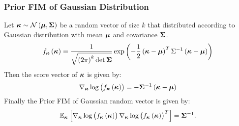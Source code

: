 





\subsubsection{Prior FIM of Gaussian Distribution}\label{apx:prior_fim_gaussian}
Let $\bm{\kappa}\sim\mathcal{N}\left(\bm{\mu},\mathbf{\Sigma}\right)$ be a random vector of size $k$ that distributed according to Gaussian distribution with mean $\bm{\mu}$ and covariance $\mathbf{\Sigma}$.
\begin{equation}
    f_{\bm{\kappa}}\left(\bm{\kappa}\right)=\frac{1}{\sqrt{\left(2\pi\right)^k\det{\mathbf{\Sigma}}}}\exp\left(-\frac{1}{2}\left(\bm{\kappa}-\bm{\mu}\right)^T\Sigma^{-1}\left(\bm{\kappa}-\bm{\mu}\right)\right)
\end{equation}
Then the score vector of $\bm{\kappa}$ is given by:
\begin{equation}
    \nabla_{\bm{\kappa}}\log\left(f_{\bm{\kappa}}\left(\bm{\kappa}\right)\right)=-\mathbf{\Sigma}^{-1}\left(\bm{\kappa}-\bm{\mu}\right)
\end{equation}
Finally the Prior FIM of Gaussian random vector is given by:
\begin{equation}
    \mathbb{E}_{\bm{\kappa}}\left[\nabla_{\bm{\kappa}}\log\left(f_{\bm{\kappa}}\left(\bm{\kappa}\right)\right)\nabla_{\bm{\kappa}}\log\left(f_{\bm{\kappa}}\left(\bm{\kappa}\right)\right)^T\right]=\mathbf{\Sigma}^{-1}.
\end{equation}

